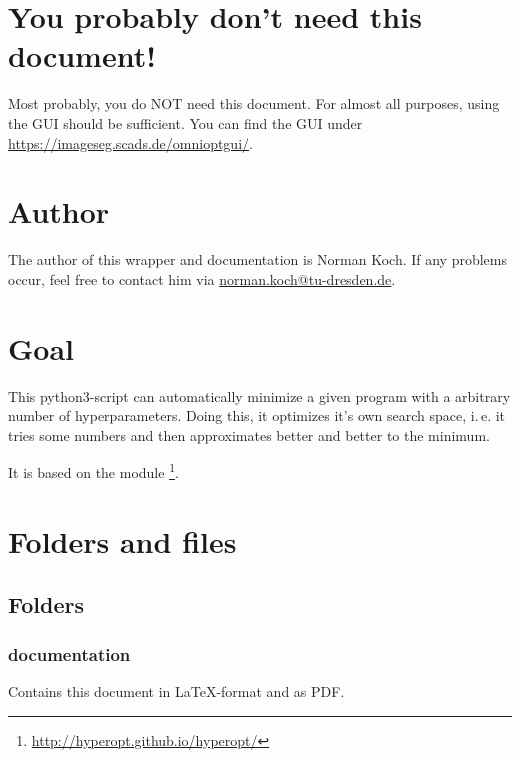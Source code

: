 \documentclass[]{scrartcl}
\begin{document}
\maketitle

\newpage

\tableofcontents

\newpage

\section{You probably don't need this document!}

Most probably, you do NOT need this document. For almost all purposes, using the GUI should be sufficient. 
You can find the GUI under \url{https://imageseg.scads.de/omnioptgui/}.

\section{Author}

The author of this wrapper and documentation is Norman Koch. If any problems
occur, feel free to contact him via \url{norman.koch@tu-dresden.de}.

\section{Goal}

This python3-script can automatically minimize a given program with a arbitrary number of hyperparameters.
Doing this, it optimizes it's own search space, i.\,e. it tries some numbers and then approximates
better and better to the minimum. 

It is based on the module \footnote{\url{http://hyperopt.github.io/hyperopt/}}.

\section{Folders and files}

\subsection{Folders}

\subsubsection{documentation}

Contains this document in \LaTeX-format and as PDF.
\end{document}
